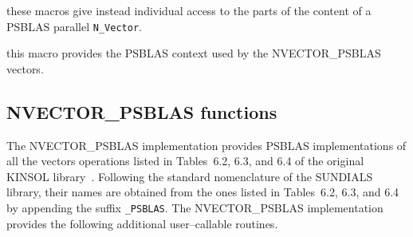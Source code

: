 \documentclass[twoside,a4paper]{refart}
\begin{document}
 these macros give instead individual access to the parts of the content of a PSBLAS parallel \texttt{N\_Vector}.  

 this macro provides the PSBLAS context used by the NVECTOR\_PSBLAS vectors.

\subsection{NVECTOR\_PSBLAS functions}

The NVECTOR\_PSBLAS implementation provides PSBLAS implementations of all the vectors operations listed in Tables~6.2, 6.3, and 6.4 of the original KINSOL library~\cite{kinsolguide}. Following the standard nomenclature of the SUNDIALS library, their names are obtained from the ones listed in Tables~6.2, 6.3, and 6.4 by appending the suffix \texttt{\_PSBLAS}. The NVECTOR\_PSBLAS implementation provides the following additional user--callable routines.
\end{document}
